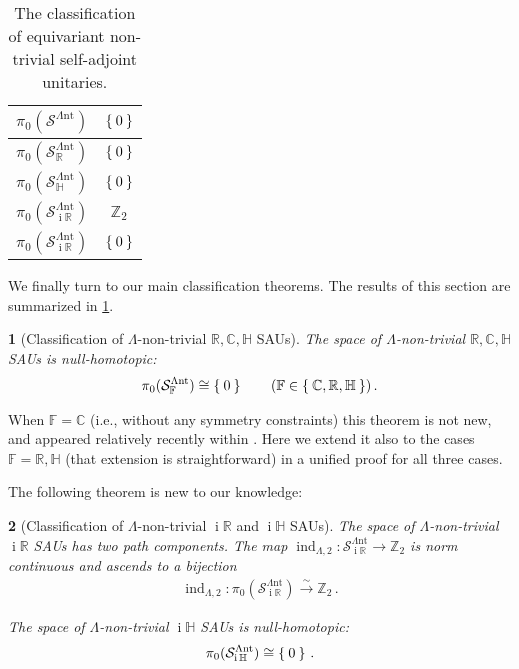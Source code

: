 \documentclass[a4paper,10pt]{article}
\numberwithin{equation}{section}
\theoremstyle{plain}
\newtheorem{thm}{\protect\theoremname}[section]
\theoremstyle{plain}
\theoremstyle{plain}
\theoremstyle{plain}
\theoremstyle{plain}
\theoremstyle{remark}
\theoremstyle{definition}
\theoremstyle{plain}
\providecommand{\theoremname}{Theorem}
\newcommand{\ii}{\operatorname{i}}
\newcommand{\ZZ}{\mathbb{Z}}
\newcommand{\RR}{\mathbb{R}}
\newcommand{\CC}{\mathbb{C}}
\newcommand{\FF}{\mathbb{F}}
\newcommand{\calSU}{\mathcal{S}}
\newcommand{\LamNT}{\Lambda\mathrm{nt}}
\newcommand{\LamNTSAU}{\calSU^{\LamNT}}
\newcommand{\HH}{\mathbb{H}}
\newcommand{\findex}{\operatorname{ind}}
\newcommand{\eql}[1]{\begin{align}#1\end{align}}
\begin{document}
	
	\begin{table}
		\begin{center}
			\begin{tabular}{|c|c|}
				\hline
				$\pi_0(\LamNTSAU)$ & $\Set{0}$\\\hline
				$\pi_0(\LamNTSAU_{\RR})$ & $\Set{0}$\\\hline
				$\pi_0(\LamNTSAU_{\HH})$ & $\Set{0}$\\\hline
				$\pi_0(\LamNTSAU_{\ii\RR})$ & $\ZZ_2$\\\hline
				$\pi_0(\LamNTSAU_{\ii\RR})$ & $\Set{0}$\\
				\hline
			\end{tabular}
		\end{center}
		\caption{The classification of equivariant non-trivial self-adjoint unitaries.}
		\label{table:equivariant Lambda-non-trivial SAUs}
	\end{table}
	We finally turn to our main classification theorems. The results of this section are summarized in \cref{table:equivariant Lambda-non-trivial SAUs}. 
	\begin{thm}[Classification of $\Lambda$-non-trivial $\RR,\CC,\HH$ SAUs]\label{thm:classification of RCH LamNT SAUs} The space of $\Lambda$-non-trivial $\RR,\CC,\HH$ SAUs is null-homotopic: \eql{\pi_0(\LamNTSAU_\FF) \cong\Set{0}\qquad(\FF\in\Set{\CC,\RR,\HH})\,.}
	\end{thm} 
	When $\FF=\CC$ (i.e., without any symmetry constraints) this theorem is not new, and appeared relatively recently within \cite{AndruchowChiumientoLucero2015}. Here we extend it also to the cases $\FF=\RR,\HH$ (that extension is straightforward) in a unified proof for all three cases.
	
	
	The following theorem is new to our knowledge: 
	
	
	
	\begin{thm}[Classification of $\Lambda$-non-trivial $\ii\RR$ and $\ii\HH$ SAUs]\label{thm:classification of iR iH LamNT SAUs} The space of $\Lambda$-non-trivial $\ii\RR$ SAUs has two path components. The map $\findex_{\Lambda,2}:\LamNTSAU_{\ii\RR}\to\ZZ_2$ is norm continuous and ascends to a bijection \eql{\findex_{\Lambda,2}:\pi_0(\LamNTSAU_{\ii\RR})\xrightarrow{\sim}\ZZ_2\,.}
		
		The space of $\Lambda$-non-trivial $\ii\HH$ SAUs is null-homotopic: \eql{\pi_0(\LamNTSAU_{\ii\HH}) \cong\Set{0}\,.}
	\end{thm} 
	
\end{document}

